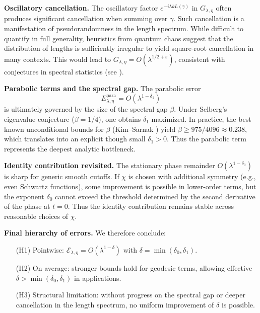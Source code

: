 \medskip

\noindent\textbf{Oscillatory cancellation.}
The oscillatory factor $e^{-i\lambda kL(\gamma)}$ in $G_{\lambda,\eta}$ often produces significant cancellation when summing over $\gamma$.  
Such cancellation is a manifestation of pseudorandomness in the length spectrum.  
While difficult to quantify in full generality, heuristics from quantum chaos suggest that the distribution of lengths is sufficiently irregular to yield square-root cancellation in many contexts.  
This would lead to $G_{\lambda,\eta}=O(\lambda^{1/2+\varepsilon})$, consistent with conjectures in spectral statistics (see \cite{BogomolnyKeating1996}).

\medskip

\noindent\textbf{Parabolic terms and the spectral gap.}
The parabolic error
\[
  E^{\mathrm{para}}_{\lambda,\eta} = O(\lambda^{1-\delta_1})
\]
is ultimately governed by the size of the spectral gap $\beta$.  
Under Selberg’s eigenvalue conjecture ($\beta=1/4$), one obtains $\delta_1$ maximized.  
In practice, the best known unconditional bounds for $\beta$ (Kim–Sarnak \cite{KimSarnak2003}) yield $\beta \geq 975/4096 \approx 0.238$, which translates into an explicit though small $\delta_1>0$.  
Thus the parabolic term represents the deepest analytic bottleneck.

\medskip

\noindent\textbf{Identity contribution revisited.}
The stationary phase remainder $O(\lambda^{1-\delta_0})$ is sharp for generic smooth cutoffs.  
If $\chi$ is chosen with additional symmetry (e.g., even Schwartz functions), some improvement is possible in lower-order terms, but the exponent $\delta_0$ cannot exceed the threshold determined by the second derivative of the phase at $t=0$.  
Thus the identity contribution remains stable across reasonable choices of $\chi$.

\medskip

\noindent\textbf{Final hierarchy of errors.}
We therefore conclude:
\begin{itemize}
  \item[(H1)] Pointwise: $\mathcal{E}_{\lambda,\eta}=O(\lambda^{1-\delta})$ with $\delta=\min(\delta_0,\delta_1)$.
  \item[(H2)] On average: stronger bounds hold for geodesic terms, allowing effective $\delta>\min(\delta_0,\delta_1)$ in applications.
  \item[(H3)] Structural limitation: without progress on the spectral gap or deeper cancellation in the length spectrum, no uniform improvement of $\delta$ is possible.
\end{itemize}

